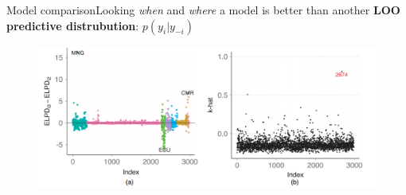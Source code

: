 \documentclass{beamer}
\begin{document}
	\begin{frame}{Model comparison}{Looking \textit{when} and \textit{where} a model is better than another}
		\textbf{LOO predictive distrubution}: $p(y_i | y_{-i}) $
		
		\begin{figure}
			\includegraphics[scale=0.36]{images/model_comparison.png}
		\end{figure}
		
	\end{frame}



	
\end{document}
